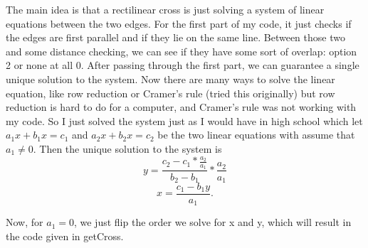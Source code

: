 \documentclass{article}
\begin{document}
The main idea is that a rectilinear cross is just solving a system of linear equations between the two edges. For the first part of my code, it just checks if the edges are first parallel and if they lie on the same line. Between those two and some distance checking, we can see if they have some sort of overlap: option 2 or none at all 0. After passing through the first part, we can guarantee a single unique solution to the system. Now there are many ways to solve the linear equation, like row reduction or Cramer's rule (tried this originally) but row reduction is hard to do for a computer, and Cramer's rule was not working with my code. So I just solved the system just as I would have in high school which let $a_{1}x + b_{1}x = c_{1}$ and $a_{2}x + b_{2}x = c_{2}$ be the two linear equations with assume that $a_{1} \neq 0$. Then the unique solution to the system is 
\[  y = \frac{c_{2} - c_{1} * \frac{a_{2}}{a_{1}}}{b_{2} - b_{1}} * \frac{a_{2}}{a_{1}}\]
\[  x =  \frac{c_{1} - b_{1}y}{a_{1}}.\]

Now, for $a_{1} = 0$, we just flip the order we solve for x and y, which will result in the code given in getCross.  

\printbibliography
\end{document}
